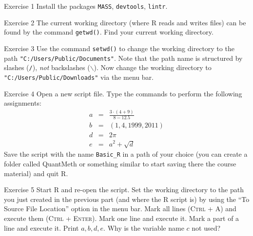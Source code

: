 \documentclass[aspectratio=169]{beamer}
\begin{document}
\begin{frame}{Exercise 1}
Install the packages \texttt{MASS}, \texttt{devtools}, %
\texttt{lintr}.
\end{frame}

\begin{frame}{Exercise 2}
The current working directory (where R reads and writes files) can be found by the command \texttt{getwd()}. Find your current working directory.
\end{frame}

\begin{frame}{Exercise 3}
Use the command \texttt{setwd()} to change the working directory to the path \texttt{"C:/Users/Public/Documents"}. Note that the path name is structured by slashes (\texttt{/}), \emph{not} backslashes ($\backslash$). Now change the working directory to \texttt{"C:/Users/Public/Downloads"} via the menu bar.
\end{frame}

\begin{frame}{Exercise 4}
Open a new script file. Type the commands to perform the following assignments:
\begin{eqnarray*}
a &=&\frac{3\cdot (4+9)}{8-12.5} \\
b &=&\left( 1,4,1999,2011\right) \\
d &=&2\pi \\
e &=&a^2+\sqrt{d}
\end{eqnarray*}
Save the script with the name \texttt{Basic\_R} in a path of your choice (you can create a folder called QuantMeth or something similar to start saving there the course material) and quit R.
\end{frame}

\begin{frame}{Exercise 5}
Start R and re-open the script. Set the working directory to the path you just created in the previous part (and where the R script is) by using the ``To Source File Location'' option in the menu bar. Mark all lines (\textsc{Ctrl + A}) and execute them (\textsc{Ctrl + Enter}). Mark one line and execute it. Mark a part of a line and execute it. Print $a, b, d, e$. Why is the variable name $c$ not used?
\end{frame}
\end{document}
